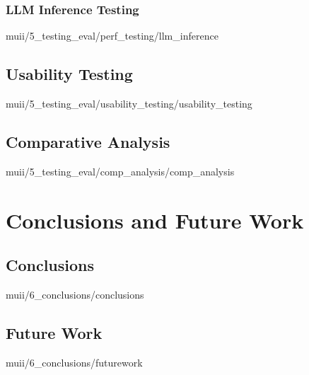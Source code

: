 \documentclass[english,epsbased,copyright,final,printable,covers,extendedindex,firstnumbered,tfm,gnuplot,loc,loe,lof,lot]{tfgtfmthesisuam}
\begin{document}
      \subsection{LLM Inference Testing\label{SS:LLMLAT}}{muii/5_testing_eval/perf_testing/llm_inference}
    
    \section{Usability Testing\label{SEC:USABILITYTEST}}{muii/5_testing_eval/usability_testing/usability_testing}
    
    \section{Comparative Analysis\label{SEC:COMPANALYSIS}}{muii/5_testing_eval/comp_analysis/comp_analysis}

  \chapter{Conclusions and Future Work\label{CAP:CONCLUSIONS}}
    \section{Conclusions\label{SEC:CONCLUSIONS}}{muii/6_conclusions/conclusions}

    \section{Future Work\label{SEC:FUTUREWORK}}{muii/6_conclusions/futurework}

  \appendix
\end{document}
